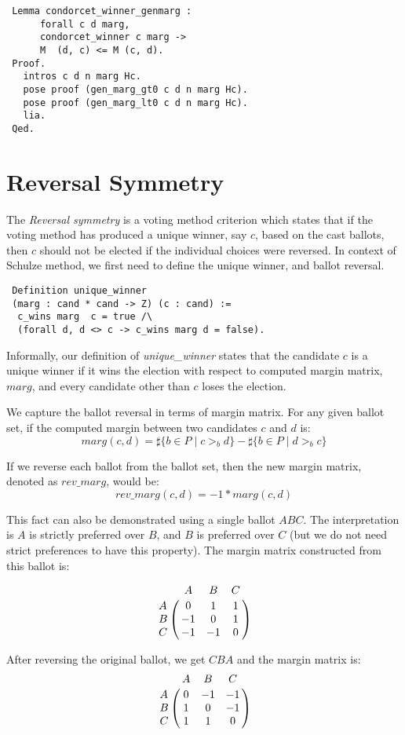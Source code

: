 \begin{verbatim}
 Lemma condorcet_winner_genmarg :
      forall c d marg, 
      condorcet_winner c marg -> 
      M  (d, c) <= M (c, d).  
 Proof.
   intros c d n marg Hc.
   pose proof (gen_marg_gt0 c d n marg Hc).
   pose proof (gen_marg_lt0 c d n marg Hc).
   lia.
 Qed.
\end{verbatim}
   
\section{Reversal Symmetry}
 The \textit{Reversal symmetry} is a voting method criterion which states that if the voting method has produced a unique 
 winner, say $c$, based on the cast ballots, then $c$ should not be elected if the individual choices were 
 reversed. In context of Schulze method, we first need to define the unique winner, and ballot reversal. 
 
 \begin{verbatim}
 Definition unique_winner 
 (marg : cand * cand -> Z) (c : cand) :=
  c_wins marg  c = true /\
  (forall d, d <> c -> c_wins marg d = false).
\end{verbatim}  

Informally, our definition of \textit{unique\_winner} states that the candidate $c$ is a unique winner
if it wins the election with respect to computed margin matrix, $marg$, and every  candidate 
other than $c$ loses the election. 

We capture the ballot reversal in terms of margin matrix. For any given ballot set, if the computed 
margin between two candidates $c$ and $d$ is: 
\[
  marg(c, d) = \sharp \lbrace b \in P \mid c >_b d \rbrace -
            \sharp \lbrace b \in P \mid d >_b c \rbrace
\] 

If we reverse each ballot from the ballot set, then the new margin matrix, denoted as $rev\_marg$, would be:
\[
  rev\_marg(c, d) = -1 * marg (c, d)
\] 

This fact can also be demonstrated using a single ballot $ABC$. The interpretation is $A$ is strictly preferred over $B$, 
and $B$ is preferred over $C$ (but we do not need strict preferences to have this property). 
The margin matrix constructed from this ballot is: 

\[
\bordermatrix{ & A & B & C \cr
      A & 0 & 1 & 1 \cr
      B & -1 & 0 & 1 \cr
      C & -1 & -1 & 0 }
      \]
      
After reversing the original ballot, we get $CBA$ and the margin matrix is:
\[
\bordermatrix{ & A & B & C \cr
      A & 0 & -1 & -1 \cr
      B & 1 & 0 & -1 \cr
      C & 1 & 1 & 0 }
      \]

